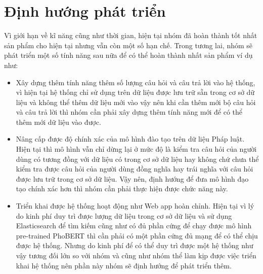 \section{Định hướng phát triển}

Vì giới hạn về kĩ năng cũng như thời gian, hiện tại nhóm đã hoàn thành tốt nhất sản phẩm cho hiện tại nhưng vẫn còn một số hạn chế. Trong tương lai, nhóm sẽ phát triển một số tính năng sau nữa để có thể hoàn thành nhất sản phẩm ví dụ như:
\begin{itemize}
	\item [-] Xây dựng thêm tính năng thêm số lượng câu hỏi và câu trả lời vào hệ thống, vì hiện tại hệ thống chỉ sử dụng trên dữ liệu được lưu trữ sẵn trong cơ sở dữ liệu và không thể thêm dữ liệu mới vào vậy nên khi cần thêm mới bộ câu hỏi và câu trả lời thì nhóm cần phải xây dựng thêm tính năng mới để có thể thêm mới dữ liệu vào được.
	\item [-] Nâng cấp được độ chính xác của mô hình đào tạo trên dữ liệu Pháp luật. Hiện tại thì mô hình vẫn chỉ dừng lại ở mức độ là kiểm tra câu hỏi của người dùng có tương đồng với dữ liệu có trong cơ sở dữ liệu hay không chứ chưa thể kiểm tra được câu hỏi của người dùng đồng nghĩa hay trái nghĩa với câu hỏi được lưu trữ trong cơ sở dữ liệu. Vậy nên, định hướng để đưa mô hình đạo tạo chính xác hơn thì nhóm cần phải thực hiện được chức năng này.
	\item [-] Triển khai được hệ thống hoạt động như Web app hoàn chỉnh. Hiện tại vì lý do kinh phí duy trì được lượng dữ liệu trong cơ sở dữ liệu và sử dụng Elasticsearch để tìm kiếm cũng như có đủ phần cứng để chạy được mô hình pre-trained PhoBERT thì cần phải có một phần cứng đủ mạng để có thể chịu được hệ thống. Nhưng do kinh phí để có thể duy trì được một hệ thống như vậy tương đối lớn so với nhóm và cũng như nhóm thể làm kịp được việc triển khai hệ thống nên phần này nhóm sẽ định hướng để phát triển thêm.
\end{itemize}

